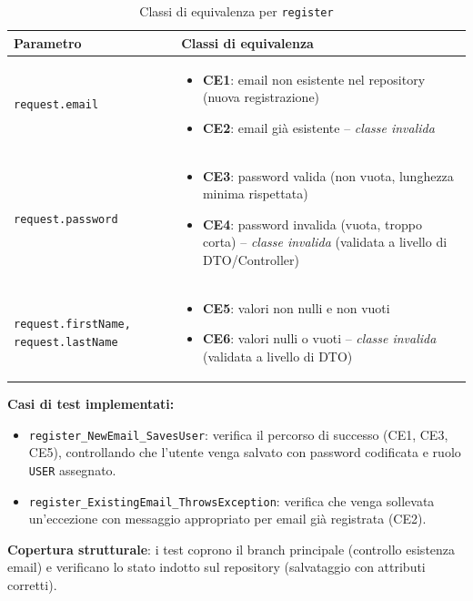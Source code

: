 \documentclass[a4paper,11pt]{report}
\begin{document}
\begin{table}[H]
\centering
\small
\renewcommand{\arraystretch}{1.3}
\begin{tabularx}{\textwidth}{|l|X|}
\toprule
\textbf{Parametro} & \textbf{Classi di equivalenza} \\
\midrule
\texttt{request.email} & 
\begin{itemize}[nosep, leftmargin=*]
  \item \textbf{CE1}: email non esistente nel repository (nuova registrazione)
  \item \textbf{CE2}: email già esistente -- \emph{classe invalida}
\end{itemize} \\
\midrule
\texttt{request.password} & 
\begin{itemize}[nosep, leftmargin=*]
  \item \textbf{CE3}: password valida (non vuota, lunghezza minima rispettata)
  \item \textbf{CE4}: password invalida (vuota, troppo corta) -- \emph{classe invalida} (validata a livello di DTO/Controller)
\end{itemize} \\
\midrule
\texttt{request.firstName, request.lastName} & 
\begin{itemize}[nosep, leftmargin=*]
  \item \textbf{CE5}: valori non nulli e non vuoti
  \item \textbf{CE6}: valori nulli o vuoti -- \emph{classe invalida} (validata a livello di DTO)
\end{itemize} \\
\bottomrule
\end{tabularx}
\caption{Classi di equivalenza per \texttt{register}}
\end{table}

\textbf{Casi di test implementati:}

\begin{itemize}[nosep]
  \item \texttt{register\_NewEmail\_SavesUser}: verifica il percorso di successo (CE1, CE3, CE5), controllando che l'utente venga salvato con password codificata e ruolo \texttt{USER} assegnato.
  \item \texttt{register\_ExistingEmail\_ThrowsException}: verifica che venga sollevata un'eccezione con messaggio appropriato per email già registrata (CE2).
\end{itemize}

\textbf{Copertura strutturale}: i test coprono il branch principale (controllo esistenza email) e verificano lo stato indotto sul repository (salvataggio con attributi corretti).
\end{document}
